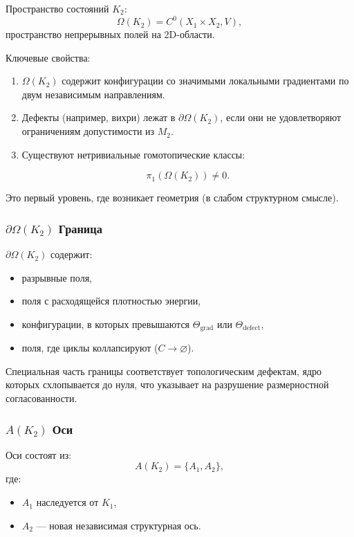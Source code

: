 Пространство состояний $K_2$:
\[
\Omega(K_2) = C^0(X_1 \times X_2, V),
\]
пространство непрерывных полей на 2D-области.

Ключевые свойства:
\begin{enumerate}
    \item $\Omega(K_2)$ содержит конфигурации со значимыми локальными
          градиентами по двум независимым направлениям.
    \item Дефекты (например, вихри) лежат в $\partial\Omega(K_2)$,
          если они не удовлетворяют ограничениям допустимости из $M_2$.
    \item Существуют нетривиальные гомотопические классы:

          \[
          \pi_1(\Omega(K_2)) \neq 0.
          \]
\end{enumerate}

Это первый уровень, где возникает геометрия (в слабом структурном смысле).

\subsubsection{\texorpdfstring{$\partial\Omega(K_2)$}{\partial\Omega(K_2)} Граница}

$\partial\Omega(K_2)$ содержит:
\begin{itemize}
    \item разрывные поля,
    \item поля с расходящейся плотностью энергии,
    \item конфигурации, в которых превышаются $\Theta_{\mathrm{grad}}$ или
          $\Theta_{\mathrm{defect}}$,
    \item поля, где циклы коллапсируют ($C \to \varnothing$).
\end{itemize}

Специальная часть границы соответствует топологическим дефектам,
ядро которых схлопывается до нуля, что указывает на разрушение
размерностной согласованности.

\subsubsection{\texorpdfstring{$A(K_2)$}{A(K_2)} Оси}

Оси состоят из:
\[
A(K_2) = \{A_1, A_2\},
\]
где:
\begin{itemize}
    \item $A_1$ наследуется от $K_1$,
    \item $A_2$ — новая независимая структурная ось.
\end{itemize}

